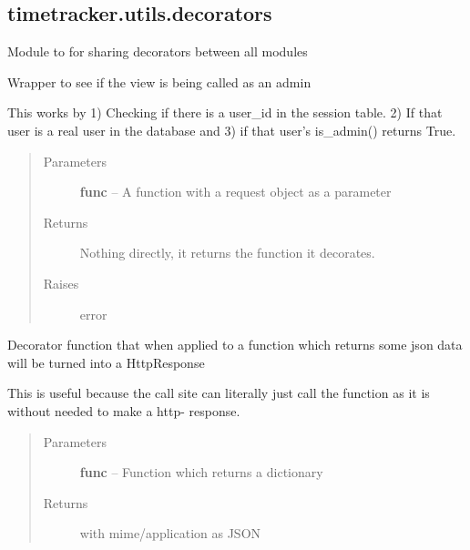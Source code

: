 \documentclass[letterpaper,10pt,english]{sphinxmanual}
\begin{document}
\subsection{timetracker.utils.decorators}
\label{timetracker:timetracker-utils-decorators}\label{timetracker:module-timetracker.utils.decorators}
Module to for sharing decorators between all modules

\begin{fulllineitems}
\label{timetracker:timetracker.utils.decorators.admin_check}
Wrapper to see if the view is being called as an admin

This works by 1) Checking if there is a user\_id in the session
table. 2) If that user is a real user in the database and 3) if
that user's is\_admin() returns True.
\begin{quote}\begin{description}
\item[{Parameters}] \leavevmode
\textbf{func} -- A function with a request object as a parameter

\item[{Returns}] \leavevmode
Nothing directly, it returns the function it decorates.

\item[{Raises }] \leavevmode
{} error

\end{description}\end{quote}

\end{fulllineitems}


\begin{fulllineitems}
\label{timetracker:timetracker.utils.decorators.json_response}
Decorator function that when applied to a function which
returns some json data will be turned into a HttpResponse

This is useful because the call site can literally just
call the function as it is without needed to make a http-
response.
\begin{quote}\begin{description}
\item[{Parameters}] \leavevmode
\textbf{func} -- Function which returns a dictionary

\item[{Returns}] \leavevmode
{} with mime/application as JSON

\end{description}\end{quote}

\end{fulllineitems}
\end{document}
